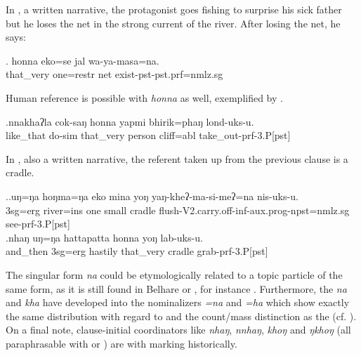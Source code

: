 In \Next, a written narrative, the protagonist goes fishing to surprise his sick father but he loses the net in the strong current of the river. After losing the net, he says:

\exg. honna           eko=se          jal wa-ya-masa=na.\\
that\_very one{\sc =restr} net exist{\sc [3sg]-pst-pst.prf=nmlz.sg}\\
  

Human reference is possible with \emph{honna} as well, exemplified by \Next.
 
\exg.nnakhaʔla   cok-saŋ       honna    yapmi  bhirik=phaŋ   lond-uks-u.\\
like\_that do{\sc -sim} that\_very  person cliff{\sc =abl} take\_out{\sc -prf-3.P[pst]}\\
 

In \Next, also a written narrative, the referent taken up from the previous clause is a cradle. 
\largerpage

\ex.\ag.uŋ=ŋa   hoŋma=ŋa   eko mina  yoŋ   yaŋ-kheʔ-ma-si-meʔ=na   nis-uks-u.\\
{\sc 3sg=erg} river{\sc =ins} one small cradle flush{\sc -V2.carry.off-inf-aux.prog-npst=nmlz.sg} see{\sc -prf-3.P[pst]}\\
 
\bg.nhaŋ    uŋ=ŋa   hattapatta honna        yoŋ   lab-uks-u.\\
and\_then {\sc 3sg=erg} hastily that\_very  cradle grab{\sc -prf-3.P[pst]}\\
 


The singular form  \emph{na} could be etymologically related to a topic particle of the same form, as it is still found in Belhare or , for instance \citep[559]{Bickel2003Belhare, Bickeletal2009Puma}. Furthermore, the  \emph{na} and \emph{kha} have  developed into the nominalizers \emph{=na} and \emph{=ha} which show exactly the same distribution with regard to  and the count/mass distinction as the  (cf. ). On a final note, clause-initial coordinators like \emph{nhaŋ}, \emph{nnhaŋ}, \emph{khoŋ} and \emph{ŋkhoŋ} (all paraphrasable with  or ) are  with  marking historically.


